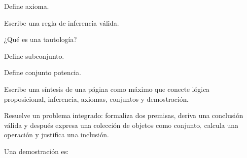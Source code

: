 \begin{activity}[id=dia-31-corta-02,type=short,weight=1]

Define axioma.

\end{activity}

\begin{activity}[id=dia-31-corta-03,type=short,weight=1]

Escribe una regla de inferencia válida.

\end{activity}

\begin{activity}[id=dia-31-corta-04,type=short,weight=1]

¿Qué es una tautología?

\end{activity}

\begin{activity}[id=dia-31-corta-05,type=short,weight=1]

Define subconjunto.

\end{activity}

\begin{activity}[id=dia-31-corta-06,type=short,weight=1]

Define conjunto potencia.

\end{activity}

\begin{activity}[id=dia-31-desarrollo-01,type=long,weight=2]

Escribe una síntesis de una página como máximo que conecte lógica proposicional, inferencia, axiomas, conjuntos y demostración.

\end{activity}

\begin{activity}[id=dia-31-desarrollo-02,type=long,weight=2]

Resuelve un problema integrado: formaliza dos premisas, deriva una conclusión válida y después expresa una colección de objetos como conjunto, calcula una operación y justifica una inclusión.

\end{activity}

\begin{activity}[id=dia-31-opcion-01,type=choice,weight=1]

Una demostración es:





\end{activity}

